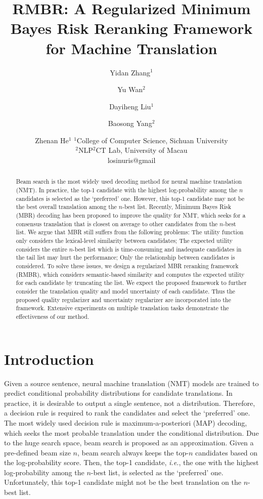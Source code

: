 \documentclass{article}
\title{RMBR: A Regularized Minimum Bayes Risk Reranking Framework \\ for Machine Translation}
\author{
Yidan Zhang$^1$
\and
Yu Wan$^2$\and
Dayiheng Liu$^1$\and
Baosong Yang$^2$\and
Zhenan He$^1$
\affiliations
$^1$College of Computer Science, Sichuan University \\
$^2$NLP$^2$CT Lab, University of Macau\\
\emails
losinuris@gmail
}
\begin{document}
\maketitle

\begin{abstract}
Beam search is the most widely used decoding method for neural machine translation (NMT). In practice, the top-1 candidate with the highest log-probability among the $n$ candidates is selected as the ‘preferred’ one. However, this top-1 candidate may not be the best overall translation among the $n$-best list. Recently, Minimum Bayes Risk (MBR) decoding has been proposed to improve the quality for NMT, which seeks for a consensus translation that is closest on average to other candidates from the $n$-best list. We argue that MBR still suffers from the following problems: The utility function only considers the lexical-level similarity between candidates; The expected utility considers the entire $n$-best list which is time-consuming and inadequate candidates in the tail list may hurt the performance; Only the relationship between candidates is considered. To solve these issues, we design a regularized MBR reranking framework (RMBR), which considers semantic-based similarity and computes the expected utility for each candidate by truncating the list. We expect the proposed framework to further consider the translation quality and model uncertainty of each candidate. Thus the proposed quality regularizer and uncertainty regularizer are incorporated into the framework. Extensive experiments on multiple translation tasks demonstrate the effectiveness of our method.
\end{abstract}

\section{Introduction}\label{sec:intro}
Given a source sentence, neural machine translation (NMT) \cite{55} models are trained to predict conditional probability distributions for candidate translations. In practice, it is desirable to output a single sentence, not a distribution. Therefore, a decision rule is required to rank the candidates and select the ‘preferred’ one. The most widely used decision rule is maximum-a-posteriori (MAP) decoding, which seeks the most probable translation under the conditional distribution. Due to the huge search space, beam search is proposed as an approximation. Given a pre-defined beam size $n$, beam search always keeps the top-$n$ candidates based on the log-probability score. Then, the top-1 candidate, \textit{i.e.}, the one with the highest log-probability among the $n$-best list, is selected as the ‘preferred’ one. Unfortunately, this top-1 candidate might not be the best translation on the $n$-best list. 
\end{document}
